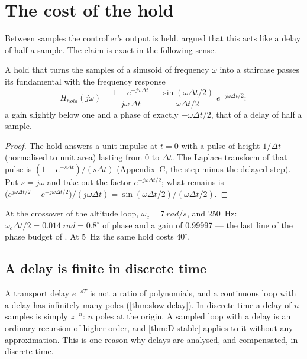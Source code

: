 \section{The cost of the hold}

Between samples the controller's output is held.  argued that this acts like a delay of half a sample. The claim is exact in the following sense.

\begin{theorem}
\label{thm:D-hold}
A hold that turns the samples of a sinusoid of frequency $\omega$ into a staircase passes its fundamental with the frequency response
\begin{equation*}
  H_{hold}(j\omega) = \frac{1 - e^{-j\omega\Delta t}}{j\omega\,\Delta t} = \frac{\sin(\omega\Delta t/2)}{\omega\Delta t/2}\;e^{-j\omega\Delta t/2} :
\end{equation*}
a gain slightly below one and a phase of exactly $-\omega\Delta t/2$, that of a delay of half a sample.
\end{theorem}
\begin{proof}
The hold answers a unit impulse at $t = 0$ with a pulse of height $1/\Delta t$ (normalised to unit area) lasting from 0 to $\Delta t$. The Laplace transform of that pulse is $(1 - e^{-s\Delta t})/(s\Delta t)$ (Appendix~C, the step minus the delayed step). Put $s = j\omega$ and take out the factor $e^{-j\omega\Delta t/2}$; what remains is $\big(e^{j\omega\Delta t/2} - e^{-j\omega\Delta t/2}\big)/(j\omega\Delta t) = \sin(\omega\Delta t/2)/(\omega\Delta t/2)$.
\end{proof}

At the crossover of the altitude loop, $\omega_c = \SI{7}{rad/s}$, and \SI{250}{Hz}: $\omega_c\Delta t/2 = \SI{0.014}{rad} = 0.8^\circ$ of phase and a gain of 0.99997 — the last line of the phase budget of . At \SI{5}{Hz} the same hold costs $40^\circ$.

\subsection{A delay is finite in discrete time}
A transport delay $e^{-sT}$ is not a ratio of polynomials, and a continuous loop with a delay has infinitely many poles (\cref{thm:slow-delay}). In discrete time a delay of $n$ samples is simply $z^{-n}$: $n$ poles at the origin. A sampled loop with a delay is an ordinary recursion of higher order, and \cref{thm:D-stable} applies to it without any approximation. This is one reason why delays are analysed, and compensated, in discrete time.

